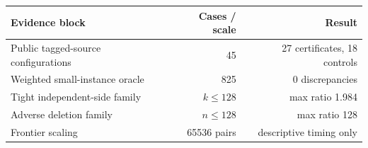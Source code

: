 \begin{tabular}{lrr}
\toprule
Evidence block & Cases / scale & Result \\
\midrule
Public tagged-source configurations & 45 & 27 certificates, 18 controls \\
Weighted small-instance oracle & 825 & 0 discrepancies \\
Tight independent-side family & $k\leq 128$ & max ratio 1.984 \\
Adverse deletion family & $n\leq 128$ & max ratio 128 \\
Frontier scaling & 65536 pairs & descriptive timing only \\
\bottomrule
\end{tabular}
